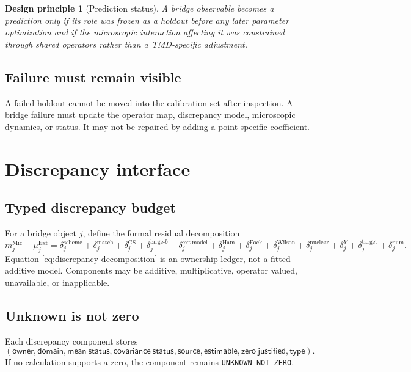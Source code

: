 \documentclass[11pt]{article}
\newtheorem{principle}[definition]{Design principle}
\newcommand{\CS}{\ensuremath{\mathrm{CS}}}
\newcommand{\Ext}{\ensuremath{\mathrm{Ext}}}
\newcommand{\Mic}{\ensuremath{\mathrm{Mic}}}
\begin{document}
\begin{principle}[Prediction status]
A bridge observable becomes a prediction only if its role was frozen as a holdout before any later parameter optimization and if the microscopic interaction affecting it was constrained through shared operators rather than a TMD-specific adjustment.
\end{principle}

\subsection{Failure must remain visible}

A failed holdout cannot be moved into the calibration set after inspection.  A bridge failure must update the operator map, discrepancy model, microscopic dynamics, or status.  It may not be repaired by adding a point-specific coefficient.

\section{Discrepancy interface}
\label{sec:discrepancy}

\subsection{Typed discrepancy budget}

For a bridge object \(j\), define the formal residual decomposition
\begin{equation}
 m_j^{\Mic}-\mu_j^{\Ext}
 =
 \delta_j^{\mathrm{scheme}}
 +\delta_j^{\mathrm{match}}
 +\delta_j^{\CS}
 +\delta_j^{\mathrm{large}\text{-}b}
 +\delta_j^{\mathrm{ext\ model}}
 +\delta_j^{\mathrm{Ham}}
 +\delta_j^{\mathrm{Fock}}
 +\delta_j^{\mathrm{Wilson}}
 +\delta_j^{\mathrm{nuclear}}
 +\delta_j^{Y}
 +\delta_j^{\mathrm{target}}
 +\delta_j^{\mathrm{num}}.
 \label{eq:discrepancy-decomposition}
\end{equation}
Equation \eqref{eq:discrepancy-decomposition} is an ownership ledger, not a fitted additive model.  Components may be additive, multiplicative, operator valued, unavailable, or inapplicable.

\subsection{Unknown is not zero}

Each discrepancy component stores
\begin{equation}
 \left(
 \mathsf{owner},\mathsf{domain},\mathsf{mean\ status},
 \mathsf{covariance\ status},\mathsf{source},
 \mathsf{estimable},\mathsf{zero\ justified},\mathsf{type}
 \right).
 \label{eq:discrepancy-record}
\end{equation}
If no calculation supports a zero, the component remains \texttt{UNKNOWN\_NOT\_ZERO}.
\end{document}
